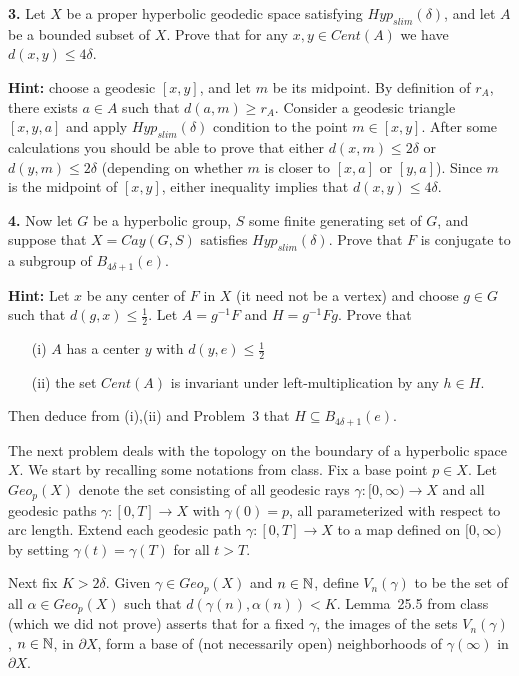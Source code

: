 \documentclass[12pt]{amsart}
\begin{document}
{\bf 3.} Let $X$ be a proper hyperbolic geodedic space satisfying $Hyp_{slim}(\delta)$, and let $A$ be a bounded subset of $X$. Prove that
for any $x,y\in Cent(A)$ we have $d(x,y)\leq 4\delta$. 

{\bf Hint:} choose a geodesic $[x,y]$, and let $m$ be its midpoint. By definition of $r_A$,
there exists $a\in A$ such that $d(a,m)\geq r_A$. Consider a geodesic triangle $[x,y,a]$ and apply $Hyp_{slim}(\delta)$ condition to the
point $m\in [x,y]$. After some calculations you should be able to prove that either $d(x,m)\leq 2\delta$ or $d(y,m)\leq 2\delta$ (depending on whether $m$ is closer to $[x,a]$ or $[y,a]$). Since $m$ is the midpoint of $[x,y]$, either inequality implies that $d(x,y)\leq 4\delta$.

\skv
{\bf 4.} Now let $G$ be a hyperbolic group, $S$ some finite generating set of $G$, and suppose that $X=Cay(G,S)$ satisfies 
$Hyp_{slim}(\delta)$. Prove that $F$ is conjugate to a subgroup of $B_{4\delta+1}(e)$. 

{\bf Hint:} Let $x$ be any center of $F$ in $X$
(it need not be a vertex) and choose $g\in G$ such that $d(g,x)\leq \frac{1}{2}$. Let $A=g^{-1}F$ and $H=g^{-1}Fg$. Prove that
\begin{itemize}
\item[(i)] $A$ has a center $y$ with $d(y,e)\leq \frac{1}{2}$
\item[(ii)] the set $Cent(A)$ is invariant under left-multiplication by any $h\in H$.
\end{itemize}
Then deduce from (i),(ii) and Problem~3 that $H\subseteq B_{4\delta+1}(e)$.
\skv

The next problem deals with the topology on the boundary of a hyperbolic space $X$. We start by recalling some notations from class.
Fix a base point $p\in X$. Let $Geo_p(X)$ denote the set consisting of all geodesic rays $\gamma:[0,\infty)\to X$ and all geodesic paths 
$\gamma:[0,T]\to X$ with $\gamma(0)=p$, all parameterized with respect to arc length. Extend each geodesic path $\gamma:[0,T]\to X$ to a map defined on $[0,\infty)$ by setting $\gamma(t)=\gamma(T)$ for all $t>T$.

Next fix $K>2\delta$. Given $\gamma\in Geo_p(X)$ and $n\in{\mathbb N}$, define $V_{n}(\gamma)$ to be the set of all $\alpha\in Geo_p(X)$
such that $d(\gamma(n),\alpha(n))<K$. Lemma~25.5 from class (which we did not prove) asserts that for a fixed $\gamma$, the images of the sets 
$V_{n}(\gamma)$, $n\in{\mathbb N}$, in $\partial X$, form a base of (not necessarily open) neighborhoods of $\gamma(\infty)$ in $\partial X$.
\end{document}
